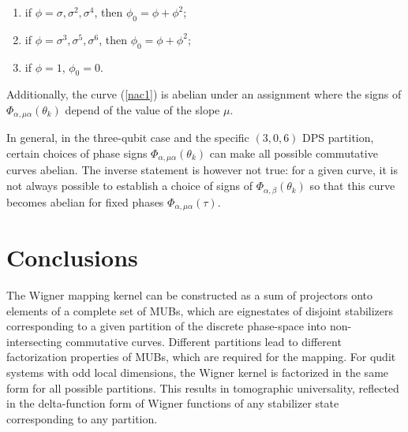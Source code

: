 \documentclass[quantumrep,article,submit,pdftex,moreauthors]{Definitions/mdpi}
\begin{document}
\begin{enumerate}
  \item if $\phi = \sigma, \sigma^{2}, \sigma^{4}$, then $\phi_{0} = \phi +
    \phi^{2}$;

  \item if $\phi = \sigma^{3}, \sigma^{5}, \sigma^{6}$, then $\phi_{0} = \phi +
    \phi^{2}$;

  \item if $\phi = 1$, $\phi_{0} = 0$.
\end{enumerate}

Additionally, the curve (\ref{nac1}) is abelian under an assignment where the
signs of $\Phi_{\alpha,\mu \alpha}(\theta_{k})$ depend of the value of the slope
$\mu$.

In general, in the three-qubit case and the specific $(3,0,6)$ DPS partition,
certain choices of phase signs $\Phi_{\alpha,\mu\alpha}(\theta_{k})$ can make
all possible commutative curves abelian. The inverse statement is however not
true: for a given curve, it is not always possible to establish a choice of
signs of $\Phi_{\alpha,\beta}(\theta_{k})$ so that this curve becomes abelian
for fixed phases $\Phi_{\alpha,\mu \alpha}(\tau)$.


\section{Conclusions}

The Wigner mapping kernel can be constructed as a sum of projectors onto
elements of a complete set of MUBs, which are eignestates of disjoint
stabilizers corresponding to a given partition of the discrete phase-space into
non-intersecting commutative curves. Different partitions lead to different
factorization properties of MUBs, which are required for the mapping. For qudit
systems with odd local dimensions, the Wigner kernel is factorized in the same
form for all possible partitions. This results in tomographic universality,
reflected in the delta-function form of Wigner functions of any stabilizer state
corresponding to any partition.
\end{document}
